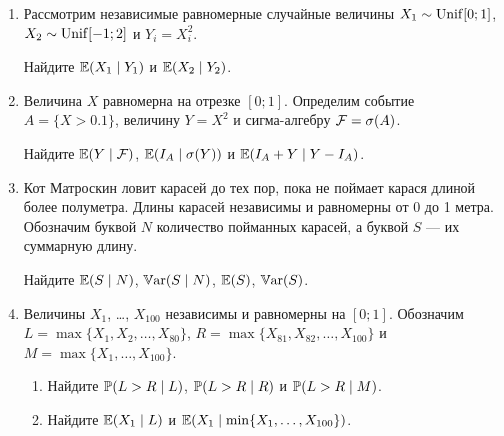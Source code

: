 \begin{enumerate}[resume]


\item Рассмотрим независимые равномерные случайные величины $X_{1}\sim \dUnif[0;1]$, $X_2 \sim \dUnif[-1;2]$ и $Y_i = X_i^2$.

Найдите $\E(X_1 \mid Y_1)$ и $\E(X_2 \mid Y_2)$.
    
    
\item  Величина $X$ равномерна на отрезке $[0;1]$. 
Определим событие $A=\{X>0.1\}$, величину $Y = X^2$ и сигма-алгебру $\cF = \sigma(A)$.

Найдите $\E(Y \mid \cF)$, $\E(I_A \mid \sigma(Y))$ и $\E(I_A + Y \mid Y-I_A)$.
    

\item Кот Матроскин ловит карасей до тех пор, пока не поймает карася длиной более полуметра. 
Длины карасей независимы и равномерны от 0 до 1 метра. 
Обозначим буквой $N$ количество пойманных карасей, а буквой $S$ — их суммарную длину. 

Найдите $\E(S \mid N)$, $\Var(S \mid N)$, $\E(S)$, $\Var(S)$.

\item Величины $X_1$, \ldots, $X_{100}$ независимы и равномерны на $[0;1]$. 
Обозначим $L=\max\{X_1, X_2, \ldots, X_80\}$, $R = \max\{X_{81}, X_{82}, \ldots, X_{100}\}$ и $M=\max\{X_1, \ldots, X_{100}\}$.


\begin{enumerate}
\item Найдите $\P(L>R \mid L)$, $\P(L>R \mid R)$ и $\P(L>R \mid M)$.
\item Найдите $\E(X_1 \mid L )$ и $\E(X_1 \mid \min \{ X_1, \ldots, X_{100}\})$.
\end{enumerate}

\end{enumerate}
